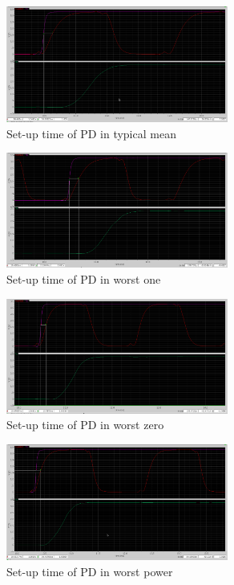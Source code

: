 \documentclass[a4paper,12pt]{article} \usepackage{graphicx}
\begin{document}
\begin{figure}[h]
  \centering
  \includegraphics[width=0.65\textwidth]{../Bilder/Layout/simulations/pd_tm.png}
  \caption{Set-up time of PD in typical mean}
  \label{fig:PDtm}
\end{figure}

\begin{figure}[h]
  \centering
  \includegraphics[width=0.65\textwidth]{../Bilder/Layout/simulations/pd_wo.png}
  \caption{Set-up time of PD in worst one}
  \label{fig:PDwo}
\end{figure}

\begin{figure}[h]
  \centering
  \includegraphics[width=0.65\textwidth]{../Bilder/Layout/simulations/pd_wz.png}
  \caption{Set-up time of PD in worst zero}
  \label{fig:PDwz}
\end{figure}

\begin{figure}[h]
  \centering
  \includegraphics[width=0.65\textwidth]{../Bilder/Layout/simulations/pd_wp.png}
  \caption{Set-up time of PD in worst power}
  \label{fig:PDwp}
\end{figure}
\end{document}
